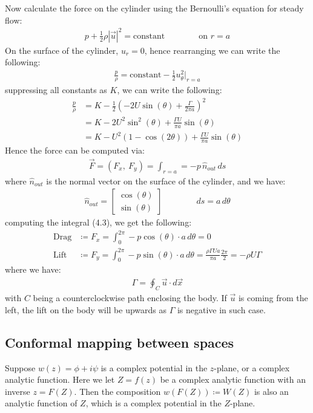 \documentclass[11pt]{book}
\theoremstyle{break}
\theoremstyle{break}
\newcommand{\bmat}[1]{\begin{bmatrix} #1 \end{bmatrix}}
\begin{document}
Now calculate the force on the cylinder using the Bernoulli's equation for steady flow:
\begin{align*}
p + \frac{1}{2}\rho |\vec{u}|^2 = \text{constant} \qquad\qquad \text{on }r=a
\end{align*} 
On the surface of the cylinder, $u_r = 0$, hence rearranging we can write the following:
\begin{align*}
\frac{p}{\rho} = \text{constant} - \frac{1}{2}u_{\theta}^2|_{r=a}
\end{align*}
suppressing all constants as $K$, we can write the following:
\begin{align*}
\frac{p}{\rho} 
&= K - \frac{1}{2}\left( -2U \sin(\theta) + \frac{\Gamma}{2\pi a}\right)^2 \\
&= K - 2U^2 \sin^2(\theta) + \frac{\Gamma U}{\pi a} \sin(\theta) \\
&= K-U^2(1-\cos(2\theta)) + \frac{\Gamma U}{\pi a}\sin(\theta)
\end{align*}
Hence the force can be computed via:
\begin{align}
\vec{F}=(F_x, \ F_y) = \int_{r= a} = -p\, \hat{n}_{out}\, ds
\end{align}
where $\hat{n}_{out}$ is the normal vector on the surface of the cylinder, and we have:
\begin{align*}
\hat{n}_{out} = \bmat{\cos(\theta) \\ \sin(\theta)} \qquad\qquad ds = a\,d\theta
\end{align*}
computing the integral (4.3), we get the following:
\begin{align*}
\text{Drag} &\coloneqq F_x = \int_0^{2\pi } -p \cos(\theta) \cdot a\, d\theta = 0\\
\text{Lift}&\coloneqq F_y = \int_0^{2\pi} -p \sin(\theta) \cdot a \, d\theta = \frac{\rho \Gamma Ua}{\pi a}\frac{2\pi}{2} = -\rho U \Gamma
\end{align*}
where we have:
\begin{align*}
\Gamma = \oint_C \vec{u}\cdot d\vec{x}
\end{align*}
with $C$ being a counterclockwise path enclosing the body. If $\vec{u}$ is coming from the left, the lift on the body will be upwards as $\Gamma$ is negative in such case.\\


\subsection{Conformal mapping between spaces}
Suppose $w(z) = \phi + i\psi$ is a complex potential in the $z$-plane, or a complex analytic function. Here we let $Z = f(z) $ be a complex analytic function with an inverse $z = F(Z)$. Then the composition $w(F(Z)) \coloneqq W(Z)$ is also an analytic function of $Z$, which is a complex potential in the $Z$-plane. \\
\end{document}
